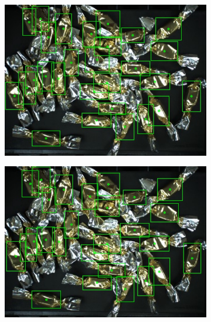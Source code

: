 \begin{figure}[H]

  \begin{subfigure}{0.5\textwidth}
    \centering
    \includegraphics[width=\linewidth]{Sources/Figures/appendix/actual_45.jpg}

  \end{subfigure}
  \begin{subfigure}{0.5\textwidth}
    \centering
    \includegraphics[width=\linewidth]{Sources/Figures/appendix/pred_45.jpg}


\end{subfigure}
\end{figure}

